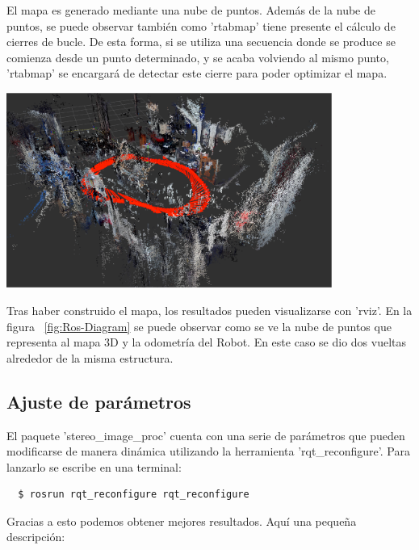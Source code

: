 El mapa es generado mediante una nube de puntos. Además de la nube de puntos, se
puede observar también como 'rtabmap' tiene presente el cálculo de cierres de
bucle. De esta forma, si se utiliza una secuencia donde se produce se comienza
desde un punto determinado, y se acaba volviendo al mismo punto, 'rtabmap' se
encargará de detectar este cierre para poder optimizar el mapa.

\begin{minipage}{\linewidth}
    \centering
    \includegraphics[width=0.8\textwidth]{images/cap4/rviz.eps}
    \label{fig:Ros-Diagram}
\end{minipage}

Tras haber construido el mapa, los resultados pueden visualizarse con 'rviz'. En
la figura ~\ref{fig:Ros-Diagram} se puede observar como se ve la nube de puntos
que representa al mapa 3D y la odometría del Robot. En este caso se dio dos
vueltas alrededor de la misma estructura.

\subsection{Ajuste de parámetros}
El paquete 'stereo\_image\_proc' cuenta con una serie de parámetros que pueden
modificarse de manera dinámica utilizando la herramienta 'rqt\_reconfigure'. Para
lanzarlo se escribe en una terminal:
\\
\begin{lstlisting}
  $ rosrun rqt_reconfigure rqt_reconfigure
\end{lstlisting}

Gracias a esto podemos obtener mejores resultados. Aquí una pequeña descripción:

